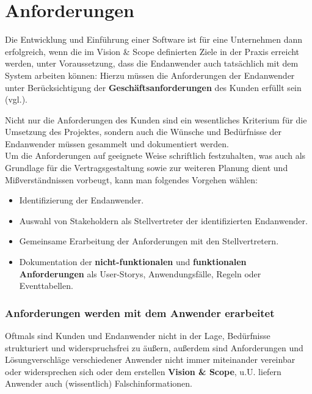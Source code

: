 \section{Anforderungen}

\vspace{5mm}
\begin{tcolorbox}
    Die Entwicklung und Einführung einer Software ist für eine Unternehmen dann erfolgreich, wenn die im Vision \& Scope definierten Ziele in der Praxis erreicht werden, unter Voraussetzung, dass die Endanwender auch tatsächlich mit dem System arbeiten können: Hierzu müssen die Anforderungen der Endanwender unter Berücksichtigung der \textbf{Geschäftsanforderungen} des Kunden erfüllt sein (vgl.\cite[54]{Wed09}).
\end{tcolorbox}
\vspace{5mm}

\noindent
Nicht nur die Anforderungen des Kunden sind ein wesentliches Kriterium für die Umsetzung des Projektes, sondern auch die Wünsche und Bedürfnisse der Endanwender müssen gesammelt und dokumentiert werden.\\

\noindent
Um die Anforderungen auf geeignete Weise schriftlich festzuhalten, was auch als Grundlage für die Vertragsgestaltung sowie zur weiteren Planung dient und Mißverständnissen vorbeugt, kann man folgendes Vorgehen wählen:

\begin{itemize}
    \item Identifizierung der Endanwender.
    \item Auswahl von Stakeholdern als Stellvertreter der identifizierten Endanwender.
    \item Gemeinsame Erarbeitung der Anforderungen mit den Stellvertretern.
    \item Dokumentation der \textbf{nicht-funktionalen} und \textbf{funktionalen Anforderungen} als User-Storys, Anwendungsfälle, Regeln oder Eventtabellen.
\end{itemize}


\noindent
\subsubsection*{Anforderungen werden mit dem Anwender erarbeitet}
Oftmals sind Kunden und Endanwender nicht in der Lage, Bedürfnisse strukturiert und widerspruchsfrei zu äußern, außerdem sind Anforderungen und Lösungverschläge verschiedener Anwender nicht immer miteinander vereinbar oder widersprechen sich oder dem erstellen \textbf{Vision \& Scope}, u.U. liefern Anwender auch (wissentlich) Falschinformationen.\\


